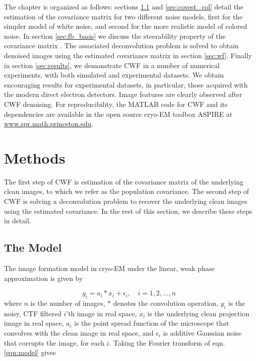 The chapter is organized as follows: sections \ref{sec:model} and 
\ref{sec:covest_col} detail the estimation of the covariance matrix for two different noise models, first for the
simpler model of white noise, and second for the more realistic model of colored noise.
In section \ref{sec:fb_basis} we discuss the steerability
property of the covariance matrix \cite{Zhao1}. 
The associated deconvolution problem
is solved to obtain denoised images using the estimated covariance matrix in section \ref{sec:wf}.
Finally in section \ref{sec:results},
we demonstrate CWF in a number of numerical experiments, with both simulated and experimental datasets.
We obtain encouraging results for experimental datasets, in particular, those acquired with the modern
direct electron detectors. Image features are clearly observed after CWF denoising. For reproducibility,
the MATLAB code for CWF and its dependencies are available in the open source
cryo-EM toolbox ASPIRE at \url{www.spr.math.princeton.edu}. 

\section{Methods}
The first 
step of CWF is estimation of the
covariance matrix of the underlying clean images, to which we refer as
the population covariance. The second step of CWF is 
solving a deconvolution problem to recover
the underlying clean images using the estimated covariance. In the rest 
of this section,
we describe these steps in detail.

\subsection{The Model}
\label{sec:model}
The image formation model in cryo-EM under the linear, weak phase 
approximation \cite{Frankbook} is given by 

\begin{equation}
 y_i = a_i \ast x_i + \epsilon_i, \quad i=1,2,\ldots,n
\label{eqn:model}
\end{equation}
where $n$ is the number of images, $\ast$ denotes the convolution operation, $y_i$ is the noisy, CTF filtered $i$'th image in real
space, $x_i$ is the underlying clean projection image in 
real space, 
$a_{i}$ is the point spread function of the microscope that
convolves with the clean image in real space, and $\epsilon_i$ is 
additive Gaussian noise that corrupts the image, for each $i$. Taking the Fourier transform of 
eqn. \ref{eqn:model} gives

